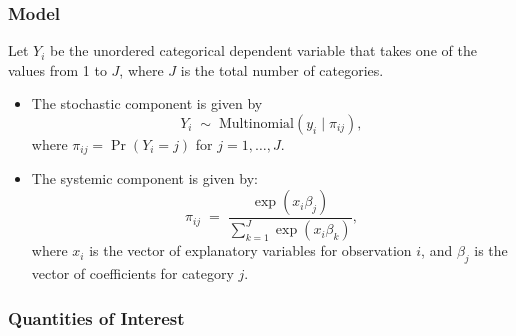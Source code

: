 \subsubsection{Model}
Let $Y_i$ be the unordered categorical dependent variable that takes
one of the values from 1 to $J$, where $J$ is the total number of
categories.

\begin{itemize}
\item The stochastic component is given by
  \begin{equation*}
    Y_i \; \sim \; \textrm{Multinomial}(y_{i} \mid \pi_{ij}), 
  \end{equation*}
  where $\pi_{ij}=\Pr(Y_i=j)$ for $j=1,\dots,J$. 
  
\item The systemic component is given by:  
  \begin{equation*}
    \pi_{ij}\; = \; \frac{\exp(x_{i}\beta_{j})}{\sum^{J}_{k = 1}
      \exp(x_{i}\beta_{k})},
  \end{equation*}
  where $x_i$ is the vector of explanatory variables for observation
  $i$, and $\beta_j$ is the vector of coefficients for category $j$.
\end{itemize}

\subsubsection{Quantities of Interest}

